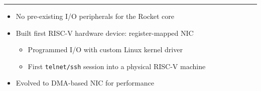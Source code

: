 \hrule
\vspace{0.5\baselineskip}
\begin{itemize}
\item No pre-existing I/O peripherals for the Rocket core
\item Built first RISC-V hardware device: register-mapped NIC
	\begin{itemize}
	\footnotesize
	\item Programmed I/O with custom Linux kernel driver
	\item First \texttt{telnet/ssh} session into a physical RISC-V machine
	\end{itemize}
\item Evolved to DMA-based NIC for performance
\end{itemize}
 



